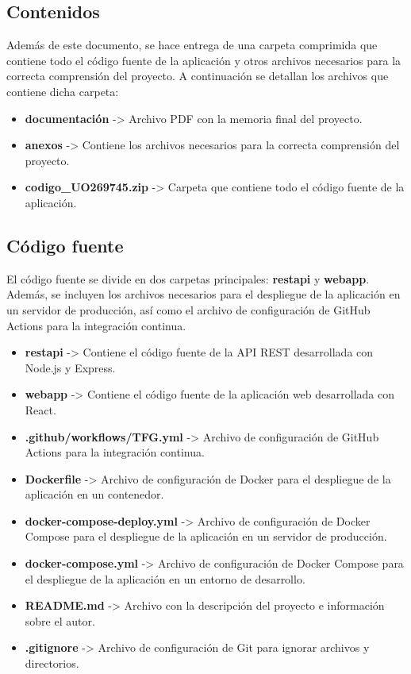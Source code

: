 \subsection*{Contenidos} 

Además de este documento, se hace entrega de una carpeta comprimida que contiene todo el código fuente de la aplicación y otros archivos necesarios para la correcta comprensión del proyecto. 
A continuación se detallan los archivos que contiene dicha carpeta:

\begin{itemize}
    \item \textbf{documentación} -> Archivo PDF con la memoria final del proyecto.
    \item \textbf{anexos} -> Contiene los archivos necesarios para la correcta comprensión del proyecto.
    \item \textbf{codigo\_UO269745.zip} -> Carpeta que contiene todo el código fuente de la aplicación.
\end{itemize}

\subsection*{Código fuente}
El código fuente se divide en dos carpetas principales: \textbf{restapi} y \textbf{webapp}.
Además, se incluyen los archivos necesarios para el despliegue de la aplicación en un servidor de producción, así como el archivo de configuración de GitHub Actions para la integración continua.

\begin{itemize}
    \item \textbf{restapi} -> Contiene el código fuente de la API REST desarrollada con Node.js y Express.
    \item \textbf{webapp} -> Contiene el código fuente de la aplicación web desarrollada con React.
    \item \textbf{.github/workflows/TFG.yml} -> Archivo de configuración de GitHub Actions para la integración continua.
    \item \textbf{Dockerfile} -> Archivo de configuración de Docker para el despliegue de la aplicación en un contenedor.
    \item \textbf{docker-compose-deploy.yml} -> Archivo de configuración de Docker Compose para el despliegue de la aplicación en un servidor de producción.
    \item \textbf{docker-compose.yml} -> Archivo de configuración de Docker Compose para el despliegue de la aplicación en un entorno de desarrollo.
    \item \textbf{README.md} -> Archivo con la descripción del proyecto e información sobre el autor.
    \item \textbf{.gitignore} -> Archivo de configuración de Git para ignorar archivos y directorios.
\end{itemize}

